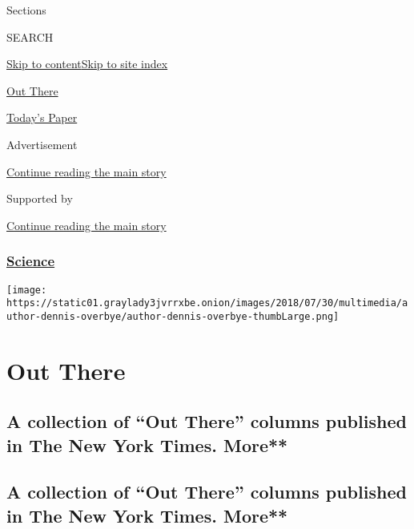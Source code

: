 Sections

SEARCH

\protect\hyperlink{site-content}{Skip to
content}\protect\hyperlink{site-index}{Skip to site index}

\href{https://www.nytimes3xbfgragh.onion/column/out-there}{Out There}

\href{https://myaccount.nytimes3xbfgragh.onion/auth/login?response_type=cookie\&client_id=vi}{}

\href{https://www.nytimes3xbfgragh.onion/section/todayspaper}{Today's
Paper}

Advertisement

\protect\hyperlink{after-top}{Continue reading the main story}

Supported by

\protect\hyperlink{after-sponsor}{Continue reading the main story}

\hypertarget{science}{%
\subsubsection{\texorpdfstring{\href{/section/science}{Science}}{Science}}\label{science}}

\texttt{[image: https://static01.graylady3jvrrxbe.onion/images/2018/07/30/multimedia/author-dennis-overbye/author-dennis-overbye-thumbLarge.png]}

\hypertarget{out-there}{%
\section{Out There}\label{out-there}}

\hypertarget{a-collection-of-out-there-columns-published-in-the-new-york-times-more}{%
\subsection{A collection of ``Out There'' columns published in The New
York Times.
More**}\label{a-collection-of-out-there-columns-published-in-the-new-york-times-more}}

\hypertarget{a-collection-of-out-there-columns-published-in-the-new-york-times-more-1}{%
\subsection{A collection of ``Out There'' columns published in The New
York Times.
More**}\label{a-collection-of-out-there-columns-published-in-the-new-york-times-more-1}}

